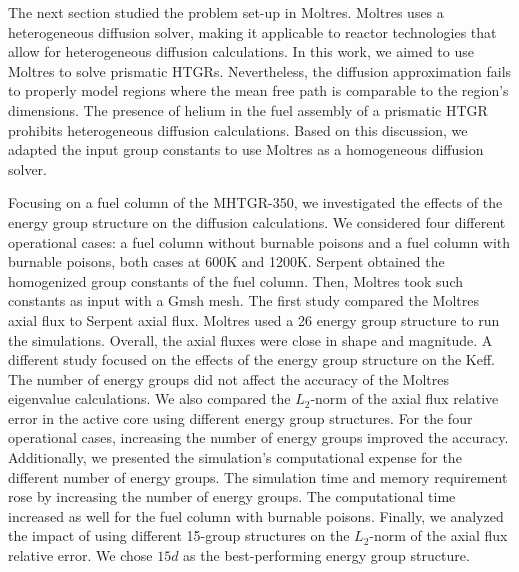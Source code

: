 The next section studied the problem set-up in Moltres.
Moltres uses a heterogeneous diffusion solver, making it applicable to reactor technologies that allow for heterogeneous diffusion calculations.
In this work, we aimed to use Moltres to solve prismatic HTGRs.
Nevertheless, the diffusion approximation fails to properly model regions where the mean free path is comparable to the region's dimensions.
The presence of helium in the fuel assembly of a prismatic \gls{HTGR} prohibits heterogeneous diffusion calculations.
Based on this discussion, we adapted the input group constants to use Moltres as a homogeneous diffusion solver.

Focusing on a fuel column of the MHTGR-350, we investigated the effects of the energy group structure on the diffusion calculations.
We considered four different operational cases: a fuel column without burnable poisons and a fuel column with burnable poisons, both cases at 600K and 1200K.
Serpent obtained the homogenized group constants of the fuel column.
Then, Moltres took such constants as input with a Gmsh mesh.
The first study compared the Moltres axial flux to Serpent axial flux.
Moltres used a 26 energy group structure to run the simulations.
Overall, the axial fluxes were close in shape and magnitude.
A different study focused on the effects of the energy group structure on the \gls{Keff}.
The number of energy groups did not affect the accuracy of the Moltres eigenvalue calculations.
We also compared the $L_2$-norm of the axial flux relative error in the active core using different energy group structures.
For the four operational cases, increasing the number of energy groups improved the accuracy.
Additionally, we presented the simulation's computational expense for the different number of energy groups.
The simulation time and memory requirement rose by increasing the number of energy groups.
The computational time increased as well for the fuel column with burnable poisons.
Finally, we analyzed the impact of using different 15-group structures on the $L_2$-norm of the axial flux relative error.
We chose $15d$ as the best-performing energy group structure.

